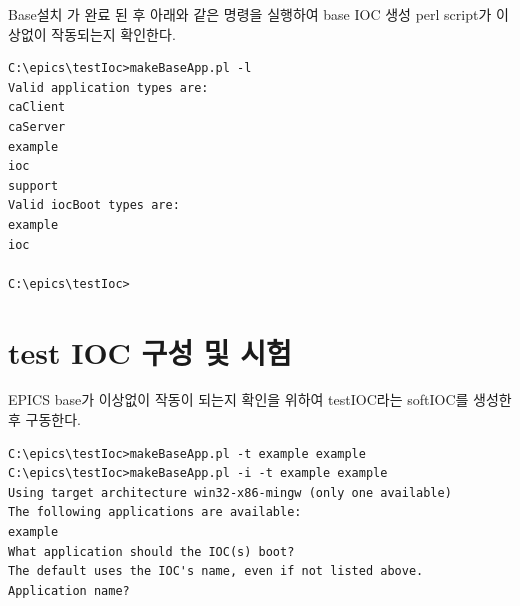 \documentclass[11pt
  , a4paper
  , article
  , oneside
]{memoir}
\begin{document}
Base설치 가 완료 된 후 아래와 같은 명령을 실행하여 base IOC 생성 perl script가 이상없이 작동되는지 확인한다.

\begin{lstlisting}[style=termstyle]
C:\epics\testIoc>makeBaseApp.pl -l
Valid application types are:
caClient
caServer
example
ioc
support
Valid iocBoot types are:
example
ioc

C:\epics\testIoc>
\end{lstlisting}

\chapter{test IOC 구성 및 시험}
EPICS base가 이상없이 작동이 되는지 확인을 위하여 testIOC라는 softIOC를 생성한 후 구동한다.

\begin{lstlisting}[style=termstyle]
C:\epics\testIoc>makeBaseApp.pl -t example example
C:\epics\testIoc>makeBaseApp.pl -i -t example example
Using target architecture win32-x86-mingw (only one available)
The following applications are available:
example
What application should the IOC(s) boot?
The default uses the IOC's name, even if not listed above.
Application name?


\end{lstlisting}
\end{document}
